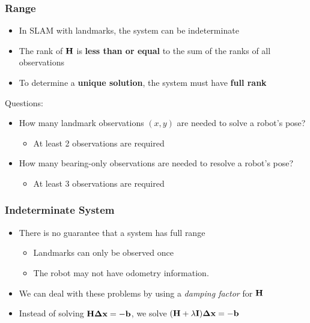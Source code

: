     \begin{frame}
    \frametitle{Range}
    \begin{itemize}
    \item In SLAM with landmarks, the system can be indeterminate
    \item The rank of $\boldsymbol{\mathbf{H}}$ is {\bf less than or equal} to the sum of the ranks of all observations
    \item To determine a {\bf unique solution}, the system must have {\bf full rank}
    \end{itemize}
    
     {
    Questions:
    }
    
    \begin{itemize}
    \item<2-> How many landmark observations $(x,y)$ are needed to solve a robot's pose?
    \begin{itemize}
    \item<3-> At least 2 observations are required
    \end{itemize}
    \item<4-> How many bearing-only observations are needed to resolve a robot's pose?
    \begin{itemize}
    \item<5-> At least 3 observations are required
    \end{itemize}
    \end{itemize}
    \end{frame}
    
    \begin{frame}
    \frametitle{Indeterminate System}
    \begin{itemize}
    \item There is no guarantee that a system has full range
    \begin{itemize}
    \item Landmarks can only be observed once
    \item The robot may not have odometry information. 
    \end{itemize}
    \item We can deal with these problems by using a \emph{damping factor} for $\boldsymbol{\mathbf{H}}$
    \item Instead of solving $\boldsymbol{\mathbf{H}} \boldsymbol{\mathbf{\Delta}} \boldsymbol{\mathbf{x}} = - \boldsymbol{\mathbf{b}}$, we solve
    $(\boldsymbol{\mathbf{H}} + \lambda \boldsymbol{\mathbf{I}}) \boldsymbol{\mathbf{\Delta}} \boldsymbol{\mathbf{x}} = - \boldsymbol{\mathbf{b}}$
     \end{itemize}
\end{frame}

